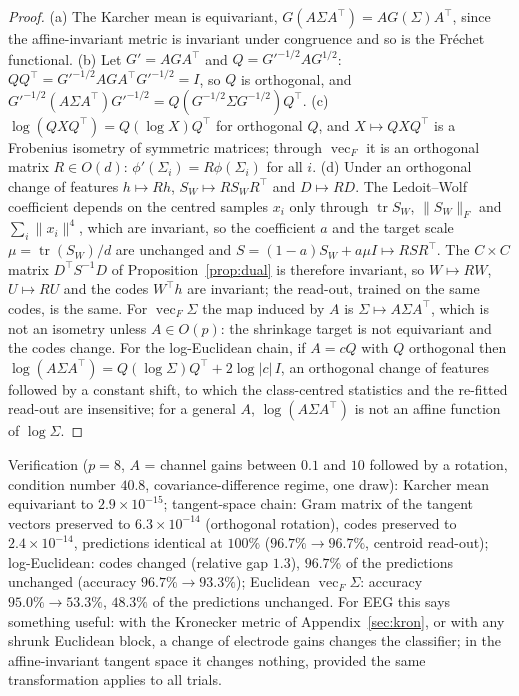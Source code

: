\documentclass[11pt,a4paper]{article}
\theoremstyle{plain}
\theoremstyle{definition}
\theoremstyle{remark}
\newcommand{\tr}{\operatorname{tr}}
\newcommand{\vecop}{\operatorname{vec}}
\newcommand{\T}{\top}
\begin{document}
\begin{proof}
(a) The Karcher mean is equivariant, $G(A\Sigma A^\T)=AG(\Sigma)A^\T$, since
the affine-invariant metric is invariant under congruence and so is the
Fr\'echet functional. (b) Let $G'=AGA^\T$ and $Q=G'^{-1/2}AG^{1/2}$:
$QQ^\T=G'^{-1/2}AGA^\T G'^{-1/2}=I$, so $Q$ is orthogonal, and
$G'^{-1/2}(A\Sigma A^\T)G'^{-1/2}=Q(G^{-1/2}\Sigma G^{-1/2})Q^\T$.
(c) $\log(QXQ^\T)=Q(\log X)Q^\T$ for orthogonal $Q$, and $X\mapsto QXQ^\T$ is a
Frobenius isometry of symmetric matrices; through $\vecop_F$ it is an
orthogonal matrix $R\in O(d)$: $\phi'(\Sigma_i)=R\phi(\Sigma_i)$ for all $i$.
(d) Under an orthogonal change of features $h\mapsto Rh$, $S_W\mapsto RS_WR^\T$
and $D\mapsto RD$. The Ledoit--Wolf coefficient depends on the centred
samples $x_i$ only through $\tr S_W$, $\|S_W\|_F$ and $\sum_i\|x_i\|^4$, which
are invariant, so the coefficient $a$ and the target scale $\mu=\tr(S_W)/d$
are unchanged and $S=(1-a)S_W+a\mu I\mapsto RSR^\T$. The $C\times C$ matrix
$D^\T S^{-1}D$ of Proposition~\ref{prop:dual} is therefore invariant, so
$W\mapsto RW$, $U\mapsto RU$ and the codes $W^\T h$ are invariant; the
read-out, trained on the same codes, is the same. For $\vecop_F\Sigma$ the map
induced by $A$ is $\Sigma\mapsto A\Sigma A^\T$, which is not an isometry
unless $A\in O(p)$: the shrinkage target is not equivariant and the codes
change. For the log-Euclidean chain, if $A=cQ$ with $Q$ orthogonal then
$\log(A\Sigma A^\T)=Q(\log\Sigma)Q^\T+2\log|c|\,I$, an orthogonal change of
features followed by a constant shift, to which the class-centred statistics
and the re-fitted read-out are insensitive; for a general $A$,
$\log(A\Sigma A^\T)$ is not an affine function of $\log\Sigma$.
\end{proof}
Verification ($p=8$, $A$ = channel gains between $0.1$ and $10$ followed by a
rotation, condition number $40.8$, covariance-difference regime, one draw):
Karcher mean equivariant to $2.9\times10^{-15}$; tangent-space chain: Gram
matrix of the tangent vectors preserved to $6.3\times10^{-14}$ (orthogonal
rotation), codes preserved to $2.4\times10^{-14}$, predictions identical at
$100\%$ ($96.7\%\to96.7\%$, centroid read-out); log-Euclidean: codes
changed (relative gap $1.3$), $96.7\%$ of the predictions unchanged
(accuracy $96.7\%\to93.3\%$); Euclidean $\vecop_F\Sigma$: accuracy
$95.0\%\to53.3\%$, $48.3\%$ of the predictions unchanged. For EEG
this says something useful: with the Kronecker metric of
Appendix~\ref{sec:kron}, or with any shrunk Euclidean block, a change of
electrode gains changes the classifier; in the affine-invariant tangent
space it changes nothing, provided the same transformation applies to all
trials.
\end{document}
